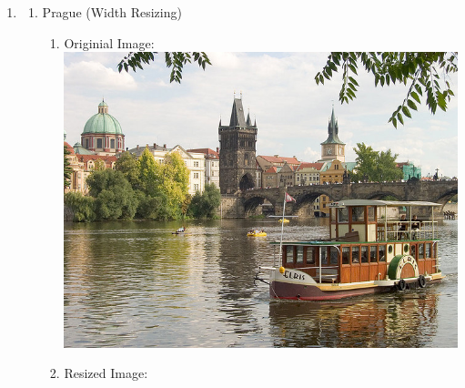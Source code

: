 \documentclass{article}
\begin{document}
\begin{enumerate}
	\item 
	
	\begin{enumerate} 
		\item Prague (Width Resizing) \\
		\begin{enumerate}
			\item Originial Image: \\ 
			\includegraphics[width=\linewidth]{../matlab/inputSeamCarvingPrague.jpg}
			\item Resized Image: \\

\end{enumerate}
\end{enumerate}
\end{enumerate}
\end{document}
